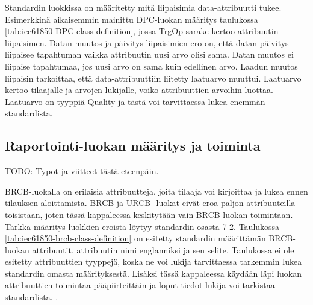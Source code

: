 Standardin luokkissa on määritetty mitä liipaisimia data-attribuutti tukee. Esimerkkinä aikaisemmin mainittu DPC-luo\-kan määritys taulukossa \ref{tab:iec61850-DPC-class-definition}, jossa TrgOp-sarake kertoo attribuutin liipaisimen. Datan muutos ja päivitys liipaisimien ero on, että datan päivitys liipaisee tapahtuman vaikka attribuutin uusi arvo olisi sama. Datan muutos ei liipaise tapahtumaa, jos uusi arvo on sama kuin edellinen arvo. Laadun muutos liipaisin tarkoittaa, että data-attribuuttiin liitetty laatuarvo muuttui. Laatuarvo kertoo tilaajalle ja arvojen lukijalle, voiko attribuuttien arvoihin luottaa. Laatuarvo on tyyppiä Quality ja tästä voi tarvittaessa lukea enemmän standardista. \mbox{\cite[s.~90]{IEC61850-7-1}}


\subsection{Raportointi-luokan määritys ja toiminta}
\label{ch:rcb-toiminta}

TODO: Typot ja viitteet tästä eteenpäin.

BRCB-luokalla on erilaisia attribuutteja, joita tilaaja voi kirjoittaa ja lukea ennen tilauksen aloittamista. BRCB ja URCB -luokat eivät eroa paljon attribuuteilla toisistaan, joten tässä kappaleessa keskitytään vain BRCB-luokan toimintaan. Tarkka määritys luokkien eroista löytyy standardin osasta 7-2. Taulukossa \ref{tab:iec61850-brcb-class-definition} on esitetty standardin määrittämän BRCB-luokan attribuutit, attribuutin nimi englanniksi ja sen selite. Taulukossa ei ole esitetty attribuuttien tyyppejä, koska ne voi lukija tarvittaessa tarkemmin lukea standardin omasta määrityksestä. Lisäksi tässä kappaleessa käydään läpi luokan attribuuttien toimintaa pääpiirteittäin ja loput tiedot lukija voi tarkistaa standardista. \mbox{\cite[s.~93--118]{IEC61850-7-2}}.


